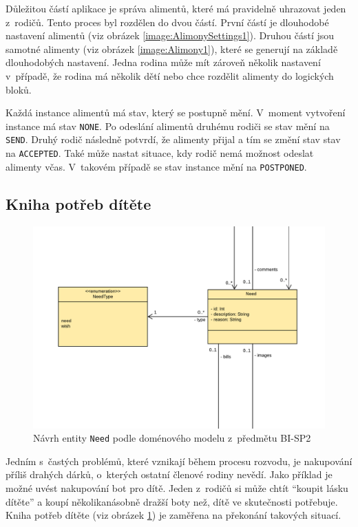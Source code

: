         Důležitou částí aplikace je správa alimentů, které má pravidelně uhrazovat jeden z~rodičů. Tento proces byl rozdělen do dvou částí. První částí je dlouhodobé nastavení alimentů (viz obrázek \ref{image:AlimonySettings1}). Druhou částí jsou samotné alimenty (viz obrázek \ref{image:Alimony1}), které se generují na základě dlouhodobých nastavení. Jedna rodina může mít zároveň několik nastavení v~případě, že rodina má několik dětí nebo chce rozdělit alimenty do logických bloků.
        
        Každá instance alimentů má stav, který se postupně mění. V~moment vytvoření instance má stav \verb|NONE|. Po odeslání alimentů druhému rodiči se stav mění na \verb|SEND|. Druhý rodič následně potvrdí, že alimenty přijal a tím se změní stav stav na \verb|ACCEPTED|. Také může nastat situace, kdy rodič nemá možnost odeslat alimenty včas. V~takovém případě se stav instance mění na \verb|POSTPONED|.
    
    \subsection{Kniha potřeb dítěte}\label{analyza:navrh:need}
        \begin{figure}\centering
	        \includegraphics[width=1.0\textwidth]{pdfs/Need1}
	        \caption[Návrh \texttt{Need}]{Návrh entity \texttt{Need} podle doménového modelu z~předmětu BI-SP2}\label{image:Need1}
        \end{figure}
        Jedním s~častých problémů, které vznikají během procesu rozvodu, je nakupování příliš drahých dárků, o~kterých ostatní členové rodiny nevědí. Jako příklad je možné uvést nakupování bot pro dítě. Jeden z~rodičů si může chtít \enquote{koupit lásku dítěte} a koupí několikanásobně dražší boty než, dítě ve skutečnosti potřebuje. Kniha potřeb dítěte (viz obrázek \ref{image:Need1}) je zaměřena na překonání takových situací.
        
